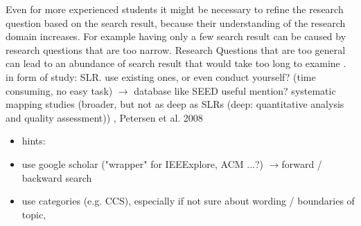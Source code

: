 \newline
Even for more experienced students it might be necessary to refine the research question based on the search result, because their understanding of the research domain increases. For example having only a few search result can be caused by research questions that are too narrow. Research Questions that are too general can lead to an abundance of search result that would take too long to examine . 
\newline
\newline
in form of study: SLR. use existing ones, or even conduct yourself? (time consuming, no easy task)
\newline
$\rightarrow$ database like SEED useful
\newline
mention? systematic mapping studies (broader, but not as deep as SLRs (deep: quantitative analysis and quality assessment))
, Petersen et al. 2008
\begin{itemize} 
	\item hints:
	\item use google scholar ("wrapper" for IEEExplore, ACM ...?) $\rightarrow$forward / backward search
	\item use categories (e.g. CCS), especially if not sure about wording / boundaries of topic, 
\end{itemize}